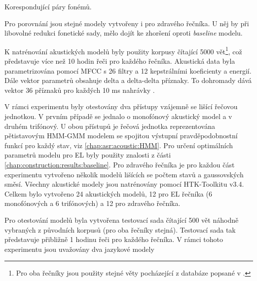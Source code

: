 \begin{table}[htpb]
  \centering
  \def\arraystretch{1.5}
  \caption{Korespondující páry fonémů.}
  \label{tab:construction:reduction:pairs}
\end{table}

\noindent Pro porovnání jsou stejné modely vytvořeny i pro zdravého řečníka. U něj by při libovolné redukci fonetické sady, mělo dojít ke zhoršení oproti \textit{baseline} modelu.

K natrénování akustických modelů byly použity korpusy čítající 5000 vět\footnote{Pro oba řečníky jsou použity stejné věty pocházející z databáze popsané v \cite{Radova2000}.}, což představuje více než 10 hodin řeči pro každého řečníka. Akustická data byla parametrizována pomocí MFCC s 26 filtry a 12 kepstrálními koeficienty a energií. Dále vektor parametrů obsahuje delta a delta-delta příznaky. To dohromady dává vektor 36 příznaků pro každých 10 ms nahrávky \cite{Psutka2007}.

V rámci experimentu byly otestovány dva přístupy vzájemně se lišící řečovou jednotkou. V prvním případě se jednalo o monofónový akustický model a v druhém trifónový. U obou přístupů je řečová jednotka reprezentována pětistavovým HMM-GMM modelem se spojitou výstupní pravděpodobnostní funkcí pro každý stav, viz \ref{chap:asr:acoustic:HMM}. Pro určení optimálních parametrů modelu pro EL byly použity znalosti z části \ref{chap:construction:results:baseline}. Pro zdravého řečníka je pro každou část experimentu vytvořeno několik modelů lišících se počtem stavů a gaussovských směsí. Všechny akustické modely jsou natrénovány pomocí HTK-Toolkitu v3.4. Celkem bylo vytvořeno 24 akustických modelů, 12 pro EL řečníka (6 monofónových a 6 trifónových) a 12 pro zdravého řečníka.

Pro otestování modelů byla vytvořena testovací sada čítající 500 vět náhodně vybraných z původních korpusů (pro oba řečníky stejná). Testovací sada tak představuje přibližně 1 hodinu řeči pro každého řečníka. V rámci tohoto experimentu jsou uvažovány dva jazykové modely

